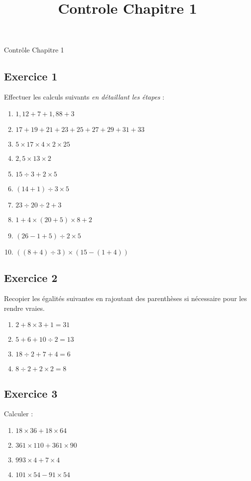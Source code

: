 \documentclass[14 pt]{extarticle}
\title{Controle Chapitre 1}
\date{}
\theoremstyle{plain}
\begin{document}
\begin{center}{\Large Contrôle Chapitre 1}\\ 
 \end{center}
 
  

\subsection*{Exercice 1} 
 
Effectuer les calculs suivants \emph{en détaillant les étapes} : 
 
 \begin{enumerate}
 \item $1,12 + 7 + 1, 88 + 3$
 \item $ 17 + 19 + 21 + 23 + 25 + 27 + 29 + 31 + 33 $
 \item $5 \times 17\times 4 \times 2 \times 25$
 \item $ 2,5 \times 13 \times 2 $
 \item $ 15 \div 3 + 2 \times 5$
 \item $ (14 +1)\div 3 \times 5$
 \item $23 \div 20 \div 2 + 3 $
 \item $ 1 + 4 \times (20 + 5) \times 8 + 2$
 \item $ (26 - 1 + 5)\div 2 \times 5$
 \item $ ( ( 8 + 4 ) \div 3 ) \times ( 15 - ( 1 + 4 ) )$
 \end{enumerate}
 
 \subsection*{Exercice 2}
 
 Recopier les égalités suivantes en rajoutant des parenthèses si nécessaire pour les rendre vraies. 
 
 \begin{enumerate}
 \item $2 + 8 \times 3 + 1 = 31$
 \item $5 + 6 + 10 \div 2  = 13$
 \item $18 \div 2 + 7 + 4 = 6 $
 \item $ 8 \div 2 + 2 \times 2 = 8 $
 \end{enumerate}
 

 \subsection*{Exercice 3} 
 
 Calculer : 
 \begin{enumerate}
 \item $18 \times 36 + 18\times 64 $
 \item $ 361 \times 110 + 361 \times 90 $
 \item $ 993 \times 4 + 7 \times 4$
 \item $ 101 \times 54 - 91 \times 54$
 \end{enumerate}
 
 	
\end{document}
